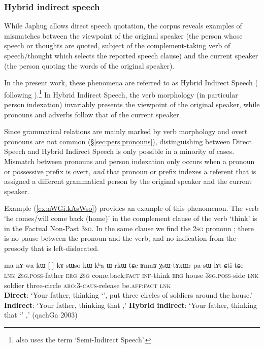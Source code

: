 \subsubsection{Hybrid indirect speech} \label{sec:hybrid indirect}
While Japhug allows direct speech quotation, the corpus reveals examples of mismatches between the viewpoint of the original speaker (the person whose speech or thoughts are quoted, subject of the complement-taking verb of speech/thought which selects the reported speech clause) and the current speaker (the person quoting the words of the original speaker).

In the present work, these phenomena are referred to as Hybrid Indirect Speech (\citealt{jacques16complementation} following \citet{tournadre08conjunct}).\footnote{\citet{aikhenvald08semidirect} also uses the term `Semi-Indirect Speech'. } In Hybrid Indirect Speech, the verb morphology (in particular person indexation) invariably presents the viewpoint of the original speaker, while pronouns and adverbs follow that of the current speaker.

Since grammatical relations are mainly marked by verb morphology and overt pronouns are not common (§\ref{sec:pers.pronouns}), distinguishing between Direct Speech and Hybrid Indirect Speech is only possible in a minority of cases. Mismatch between pronouns and person indexation only occurs when a pronoun or possessive prefix is overt, \textit{and} that pronoun or prefix indexes a referent that is assigned a different grammatical person by the  original speaker and the current speaker.
 
   
Example (\ref{ex:nWGi.kAsWso}) provides an example of this phenomenon. The verb  `he comes/will come back (home)' in the complement clause of the verb  `think' is in the Factual Non-Past \textsc{3sg}. In the same clause we find the \textsc{2sg} pronoun ; there is no pause between the pronoun and the verb, and no indication from the prosody that  is left-dislocated. 


\begin{exe}
\ex \label{ex:nWGi.kAsWso}
\gll ma nɤ-wa kɯ [ 	]  kɤ-sɯso kɯ kʰa ɯ-rkɯ tɕe ʁmaʁ χsɯ-tɤxɯr pa-sɯ-lɤt ɕti tɕe \\
\textsc{lnk} \textsc{2sg}.\textsc{poss}-father \textsc{erg} \textsc{2sg} {come.back:\textsc{fact}}  \textsc{inf}-think \textsc{erg} house \textsc{3sg}.\textsc{poss}-side \textsc{lnk} soldier three-circle \textsc{aro}:3\flobv{}-\textsc{caus}-release be.\textsc{aff}:\textsc{fact} \textsc{lnk}\\
\glt \textbf{Direct}: `Your father, thinking `',   put three circles of soldiers around the house.' 
\glt  \textbf{Indirect}: `Your father, thinking that ,'
\glt  \textbf{Hybrid indirect}: `Your father, thinking that `' ,' (qachGa 2003)
\end{exe}

